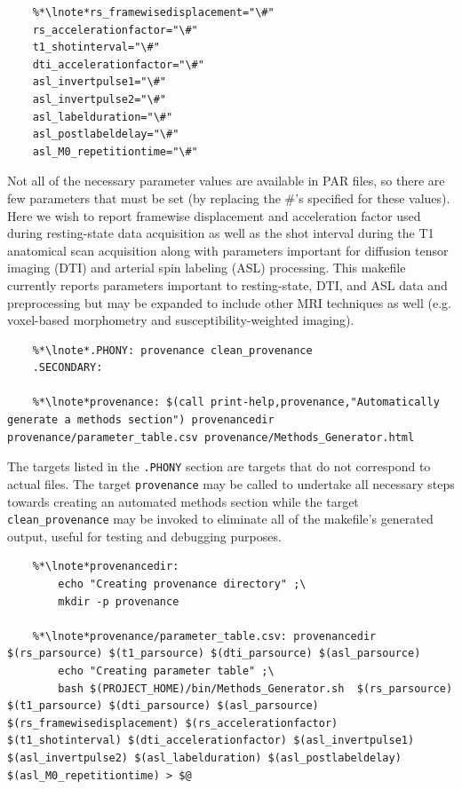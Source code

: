 \begin{lstlisting}
	%*\lnote*rs_framewisedisplacement="\#"
	rs_accelerationfactor="\#"
	t1_shotinterval="\#"
	dti_accelerationfactor="\#"
	asl_invertpulse1="\#"
	asl_invertpulse2="\#"
	asl_labelduration="\#"
	asl_postlabeldelay="\#"
	asl_M0_repetitiontime="\#"
\end{lstlisting}


 Not all of the necessary parameter values are available in PAR files, so there are few parameters that must be set (by replacing the \#'s specified for these values). Here we wish to report framewise displacement and acceleration factor used during resting-state data acquisition as well as the shot interval during the T1 anatomical scan acquisition along with parameters important for diffusion tensor imaging (DTI) and arterial spin labeling (ASL) processing. This makefile currently reports parameters important to resting-state, DTI, and ASL data and preprocessing but may be expanded to include other MRI techniques as well (e.g. voxel-based morphometry and susceptibility-weighted imaging).


\begin{lstlisting}
	%*\lnote*.PHONY: provenance clean_provenance
	.SECONDARY:
	
	%*\lnote*provenance: $(call print-help,provenance,"Automatically generate a methods section") provenancedir provenance/parameter_table.csv provenance/Methods_Generator.html
\end{lstlisting}

 The targets listed in the \texttt{.PHONY} section are targets that do not correspond to actual files. The target  \texttt{provenance} may be called to undertake all necessary steps towards creating an automated methods section while the target \texttt{clean_provenance} may be invoked to eliminate all of the makefile's generated output, useful for testing and debugging purposes.

\begin{lstlisting}
	%*\lnote*provenancedir: 
		echo "Creating provenance directory" ;\
		mkdir -p provenance
		
	%*\lnote*provenance/parameter_table.csv: provenancedir $(rs_parsource) $(t1_parsource) $(dti_parsource) $(asl_parsource)
		echo "Creating parameter table" ;\
		bash $(PROJECT_HOME)/bin/Methods_Generator.sh  $(rs_parsource) $(t1_parsource) $(dti_parsource) $(asl_parsource) $(rs_framewisedisplacement) $(rs_accelerationfactor) $(t1_shotinterval) $(dti_accelerationfactor) $(asl_invertpulse1) $(asl_invertpulse2) $(asl_labelduration) $(asl_postlabeldelay) $(asl_M0_repetitiontime) > $@
\end{lstlisting}

